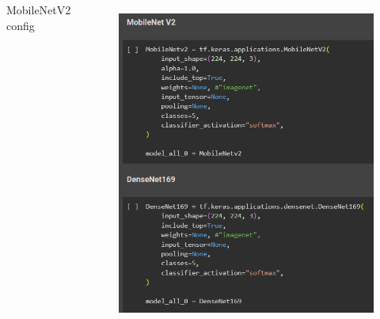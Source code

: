 \documentclass[aspectratio=169]{beamer}
\begin{document}
\begin{frame}
\begin{columns}

        \centering
        MobileNetV2 config

        \begin{figure}
            \centering
            \includegraphics[scale = 0.4]{img/TmobileNet.png}
            \label{fig:enter-label}
        \end{figure}



    \end{columns}





\end{frame}







\end{document}
